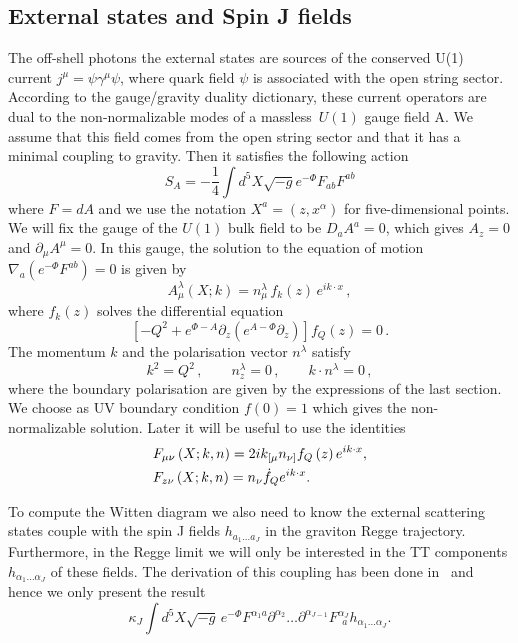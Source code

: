 \documentclass[preprint, 12pt]{elsarticle}
\begin{document}
\subsection{External states and Spin J fields}

The off-shell photons the external states are sources of the conserved U(1) current $j^\mu = \psi \gamma^\mu \psi$, where quark field $\psi$ is associated with the open string sector. According to the gauge/gravity duality dictionary, these current operators are dual to the non-normalizable modes of a massless~$U(1)$ gauge field A. We assume that this field comes from the open string sector and that it has a minimal coupling to gravity. Then it satisfies the following action 
\begin{equation}
S_A = - \frac{1}{4} \int d^5 X \sqrt{-g} e^{- \Phi} F_{ab} F^{ab}
\end{equation}
where $F=dA$ and we use the notation $X^a=(z,x^\alpha)$ for five-dimensional points. 
We will fix the gauge of the $U(1)$ bulk field to be $D_a A^a = 0$, which gives  
$A_z = 0$ and $\partial_\mu A^\mu = 0$. In this gauge, the solution to the equation of motion 
$ \nabla_a \left( e^{-\Phi} F^{ab} \right)=0$ is given by
\begin{equation}
 A_\mu^\lambda \left( X ; k\right) =  n_\mu^\lambda \, f_k ( z )\,e^{i k \cdot x}\,,
\end{equation}
where $f_k(z)$ solves the differential equation
\begin{equation}
  \label{eq:u1 eom gauge fixed}
  \left[-Q^2+e^{\Phi-A}\partial_z\left(e^{A-\Phi}\partial_z \right) \right]f_Q(z)= 0 \,.
\end{equation}
The momentum  $k$ and the polarisation vector $n^\lambda$ satisfy
\begin{equation}
  k^2 = Q^2 \,, \qquad 
  n^\lambda_z = 0 \,, \qquad
   k \cdot n^\lambda = 0 \,,
\end{equation}
where the boundary polarisation are given by the expressions of the last section. 
We choose as UV boundary condition $f(0)=1$ which gives the non-normalizable solution.
Later it will be useful to use the identities
\begin{align}
&F_{\mu\nu}\left(X; k, n\right) = 2 i k_{[\mu}n_{\nu]} f_Q \left(z\right) e^{i k \cdot x}, \notag \\
&F_{z\nu} \left(X; k, n\right) = n_\nu \dot{f}_Q e^{i k \cdot x}.
\label{eq:F_expression}
\end{align}

To compute the Witten diagram we also need to know the external scattering states couple with the spin J fields $h_{a_1 \dots a_J}$ in the graviton Regge trajectory. 
Furthermore, in the Regge limit we will only be interested in the TT components $h_{\alpha_1 \dots \alpha_J}$ of these fields. The derivation of this coupling has been done in~\cite{ballon_bayona_unity_2017} and hence we only present the result
\begin{equation}
  \kappa_J  \int  d^5 X \sqrt{-g} \, e^{-\Phi }   F^{\alpha_1 a} \partial^{\alpha_2} \dots \partial^{\alpha_{J-1}}F^{\alpha_J}_{\ \ a}
  h_{\alpha_1\dots \alpha_J} .
\end{equation}
\end{document}
